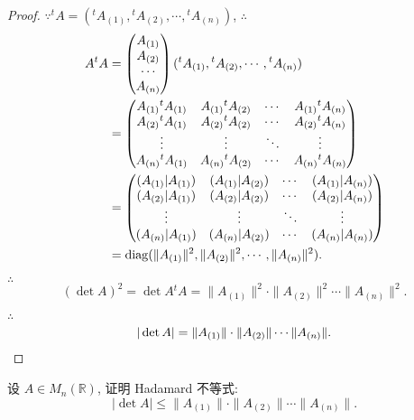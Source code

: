 \documentclass{ctexart}
\begin{document}
\begin{proof}
    $\because{}^tA=({}^tA_{(1)},{}^tA_{(2)},\cdots,{}^tA_{(n)})$, $\therefore$
    \begin{align*}
        A{}^tA & =\begin{pmatrix}
            A_{(1)} \\
            A_{(2)} \\
            \cdots \\
            A_{(n)} \\
        \end{pmatrix}({}^tA_{(1)},{}^tA_{(2)},\cdots,{}^tA_{(n)}) \\
        & =\begin{pmatrix}
            A_{(1)}{}^tA_{(1)} & A_{(1)}{}^tA_{(2)} & \cdots & A_{(1)}{}^tA_{(n)} \\
            A_{(2)}{}^tA_{(1)} & A_{(2)}{}^tA_{(2)} & \cdots & A_{(2)}{}^tA_{(n)} \\
            \vdots  & \vdots  & \ddots & \vdots \\
            A_{(n)}{}^tA_{(1)} & A_{(n)}{}^tA_{(2)} & \cdots & A_{(n)}{}^tA_{(n)} \\
        \end{pmatrix} \\
        & =\begin{pmatrix}
            (A_{(1)}|A_{(1)}) & (A_{(1)}|A_{(2)}) & \cdots & (A_{(1)}|A_{(n)}) \\
            (A_{(2)}|A_{(1)}) & (A_{(2)}|A_{(2)}) & \cdots & (A_{(2)}|A_{(n)}) \\
            \vdots  & \vdots  & \ddots & \vdots \\
            (A_{(n)}|A_{(1)}) & (A_{(n)}|A_{(2)}) & \cdots & (A_{(n)}|A_{(n)}) \\
        \end{pmatrix} \\
        & =\operatorname{diag} (\|A_{(1)}\|^2,\|A_{(2)}\|^2,\cdots,\|A_{(n)}\|^2).
    \end{align*}

    $\therefore$
    \[(\det A)^2=\det A{}^tA=\|A_{(1)}\|^2\cdot\|A_{(2)}\|^2\cdots\|A_{(n)}\|^2.\]

    $\therefore$
    \[|\det A|=\|A_{(1)}\|\cdot\|A_{(2)}\|\cdots\|A_{(n)}\|.\qedhere\]
\end{proof}
\begin{exercise}%
    设 $A\in M_n(\mathbb{R})$, 证明 Hadamard 不等式:
    \[|\det A|\leq\|A_{(1)}\|\cdot\|A_{(2)}\|\cdots\|A_{(n)}\|.\]
\end{exercise}
\end{document}
